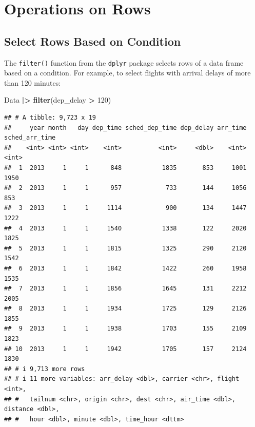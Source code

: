 \documentclass[
]{book}
\newenvironment{Shaded}{\begin{snugshade}}{\end{snugshade}}
\newcommand{\DecValTok}[1]{\textcolor[rgb]{0.00,0.00,0.81}{#1}}
\newcommand{\FunctionTok}[1]{\textcolor[rgb]{0.13,0.29,0.53}{\textbf{#1}}}
\newcommand{\NormalTok}[1]{#1}
\newcommand{\SpecialCharTok}[1]{\textcolor[rgb]{0.81,0.36,0.00}{\textbf{#1}}}
\theoremstyle{definition}
\theoremstyle{definition}
\theoremstyle{definition}
\theoremstyle{definition}
\theoremstyle{remark}
\begin{document}
\hypertarget{operations-on-rows}{%
\section{Operations on Rows}\label{operations-on-rows}}

\hypertarget{select-rows-based-on-condition}{%
\subsection{Select Rows Based on Condition}\label{select-rows-based-on-condition}}

The \texttt{filter()} function from the \texttt{dplyr} package selects rows of a data frame based on a condition. For example, to select flights with arrival delays of more than 120 minutes:

\begin{Shaded}
\begin{Highlighting}[]
\NormalTok{Data }\SpecialCharTok{|\textgreater{}} 
  \FunctionTok{filter}\NormalTok{(dep\_delay }\SpecialCharTok{\textgreater{}} \DecValTok{120}\NormalTok{)}
\end{Highlighting}
\end{Shaded}

\begin{verbatim}
## # A tibble: 9,723 x 19
##     year month   day dep_time sched_dep_time dep_delay arr_time sched_arr_time
##    <int> <int> <int>    <int>          <int>     <dbl>    <int>          <int>
##  1  2013     1     1      848           1835       853     1001           1950
##  2  2013     1     1      957            733       144     1056            853
##  3  2013     1     1     1114            900       134     1447           1222
##  4  2013     1     1     1540           1338       122     2020           1825
##  5  2013     1     1     1815           1325       290     2120           1542
##  6  2013     1     1     1842           1422       260     1958           1535
##  7  2013     1     1     1856           1645       131     2212           2005
##  8  2013     1     1     1934           1725       129     2126           1855
##  9  2013     1     1     1938           1703       155     2109           1823
## 10  2013     1     1     1942           1705       157     2124           1830
## # i 9,713 more rows
## # i 11 more variables: arr_delay <dbl>, carrier <chr>, flight <int>,
## #   tailnum <chr>, origin <chr>, dest <chr>, air_time <dbl>, distance <dbl>,
## #   hour <dbl>, minute <dbl>, time_hour <dttm>
\end{verbatim}
\end{document}
